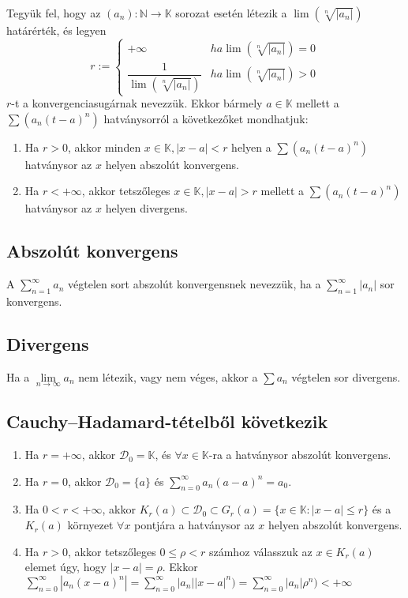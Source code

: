 \documentclass[margin=0px]{article}
\begin{document}
Tegyük fel, hogy az $(a_{n}) : \mathbb{N} \to \mathbb{K}$ sorozat esetén létezik a $\lim{(\sqrt[n]{|a_{n}|})}$ határérték, és legyen
$$ r := \left\{\begin{array} {lr}
        +\infty                              & ha \lim{(\sqrt[n]{|a_{n}|})} = 0 \\
        \dfrac{1}{\lim{(\sqrt[n]{|a_{n}|})}} & ha \lim{(\sqrt[n]{|a_{n}|})} > 0
    \end{array}\right.$$
$r$-t a konvergenciasugárnak nevezzük.
Ekkor bármely $a \in \mathbb{K}$ mellett a $\sum{(a_{n}(t-a)^{n})}$ hatványsorról a következőket mondhatjuk:
\begin{enumerate}
    \item Ha $r > 0$, akkor minden $x \in \mathbb{K}, |x-a| < r$ helyen a $\sum{(a_{n}(t-a)^{n})}$ hatványsor az $x$ helyen abszolút konvergens.
    \item Ha $r < +\infty$, akkor tetszőleges $x \in \mathbb{K}, |x-a| > r$ mellett a $\sum{(a_{n}(t-a)^{n})}$ hatványsor az $x$ helyen divergens.
\end{enumerate}

\subsection{Abszolút konvergens}

A $\sum\limits_{n=1}^{\infty}{a_{n}}$ végtelen sort abszolút konvergensnek nevezzük, ha a $\sum\limits_{n=1}^{\infty}{|a_{n}|}$ sor konvergens.

\subsection{Divergens}

Ha a $\lim\limits_{n \to \infty}{a_{n}}$ nem létezik, vagy nem véges, akkor a $\sum{a_{n}}$ végtelen sor divergens.

\subsection{Cauchy--Hadamard-tételből következik}

\begin{enumerate}
    \item Ha $r = +\infty$, akkor $\mathcal{D}_{0} = \mathbb{K}$, és $\forall x \in \mathbb{K}$-ra a hatványsor abszolút konvergens.
    \item Ha $r = 0$, akkor $\mathcal{D}_{0} = \{a\}$ és $\sum\limits_{n=0}^{\infty}{a_{n}(a-a)^{n}} = a_{0}$.
    \item Ha $0 < r < +\infty$, akkor $K_{r}(a) \subset \mathcal{D}_{0} \subset G_{r}(a) = \{x \in \mathbb{K} : |x-a| \leq r\}$ és a $K_{r}(a)$ környezet $\forall x$ pontjára a hatványsor az $x$ helyen abszolút konvergens.
    \item Ha $r > 0$, akkor tetszőleges $0 \leq \rho < r$ számhoz válasszuk az $x \in K_{r}(a)$ elemet úgy, hogy $|x-a| = \rho$. Ekkor $\sum\limits_{n=0}^{\infty}{|a_{n}(x-a)^{n}|} = \sum\limits_{n=0}^{\infty}{|a_{n}||x-a|^{n})} = \sum\limits_{n=0}^{\infty}{|a_{n}|\rho^{n})} < +\infty$
\end{enumerate}
\end{document}
